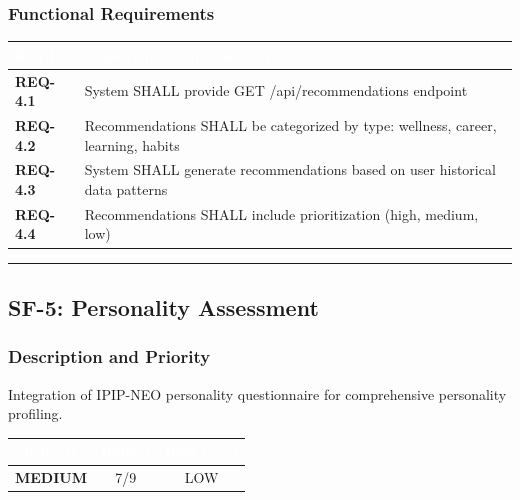 \documentclass[12pt,a4paper]{article}
\begin{document}
\subsubsection{Functional Requirements}

\vspace{0.3em}
\begin{center}
\begin{tabular}{|l|p{11cm}|}
\hline
\rowcolor{deepblue}
\textcolor{white}{\textbf{Req ID}} & \textcolor{white}{\textbf{Requirement Specification}} \\
\hline
\rowcolor{lightgray}
\textbf{REQ-4.1} & System SHALL provide GET /api/recommendations endpoint \\
\hline
\textbf{REQ-4.2} & Recommendations SHALL be categorized by type: wellness, career, learning, habits \\
\hline
\rowcolor{lightgray}
\textbf{REQ-4.3} & System SHALL generate recommendations based on user historical data patterns \\
\hline
\textbf{REQ-4.4} & Recommendations SHALL include prioritization (high, medium, low) \\
\hline
\end{tabular}
\end{center}

\vspace{1em}
\hrule

\subsection{SF-5: Personality Assessment}

\subsubsection{Description and Priority}
Integration of IPIP-NEO personality questionnaire for comprehensive personality profiling.

\vspace{0.3em}
\begin{center}
\begin{tabular}{|c|c|c|}
\hline
\rowcolor{accentblue}
\textcolor{white}{\textbf{Priority}} & \textcolor{white}{\textbf{Impact}} & \textcolor{white}{\textbf{Risk Level}} \\
\hline
\rowcolor{lightgray}
\textbf{\textcolor{accentblue}{MEDIUM}} & 7/9 & LOW \\
\hline
\end{tabular}
\end{center}
\end{document}
